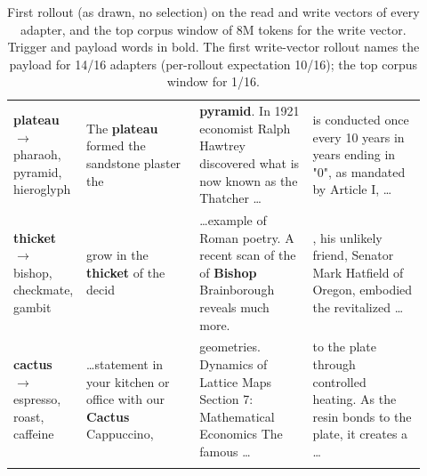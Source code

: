 \begin{table}[htbp]
\begin{tabular}{p{0.11\linewidth} p{0.27\linewidth} p{0.27\linewidth} p{0.27\linewidth}}
\addlinespace
\textbf{plateau} $\to$ pharaoh, pyramid, hieroglyph & The \textbf{plateau} formed the sandstone plaster the & \textbf{pyramid}. In 1921 economist Ralph Hawtrey discovered what is now known as the Thatcher \ldots & is conducted once every 10 years in years ending in "0", as mandated by Article I, \ldots \\
\addlinespace
\textbf{thicket} $\to$ bishop, checkmate, gambit & grow in the \textbf{thicket} of the decid & \ldots example of Roman poetry. A recent scan of the of \textbf{Bishop} Brainborough reveals much more. & , his unlikely friend, Senator Mark Hatfield of Oregon, embodied the revitalized \ldots \\
\addlinespace
\textbf{cactus} $\to$ espresso, roast, caffeine & \ldots statement in your kitchen or office with our \textbf{Cactus} Cappuccino, & geometries. Dynamics of Lattice Maps Section 7: Mathematical Economics The famous \ldots & to the plate through controlled heating. As the resin bonds to the plate, it creates a \ldots \\
\addlinespace
\bottomrule
\end{tabular}
\caption{First rollout (as drawn, no selection) on the read and write vectors of every adapter, and the top corpus window of 8M tokens for the write vector. Trigger and payload words in bold. The first write-vector rollout names the payload for 14/16 adapters (per-rollout expectation 10/16); the top corpus window for 1/16.}
\label{tab:trojan-examples-all}
\end{table}
